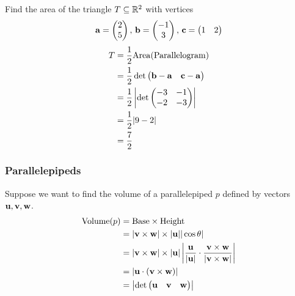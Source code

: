 \documentclass[10pt, a4paper]{article}
\begin{document}
\begin{example}
    Find the area of the triangle $T \subseteq \mathbb{R} ^ 2$ with vertices
    \[
    \mathbf{a} = \begin{pmatrix}
        2 \\ 5
    \end{pmatrix},\,\mathbf{b} = \begin{pmatrix}
        -1 \\ 3
    \end{pmatrix},\,\mathbf{c} = \begin{pmatrix}
        1 & 2
    \end{pmatrix}
    \]
    \begin{align*}
        T &= \frac{1}{2}\mathrm{Area}(\text{Parallelogram}) \\
        &= \frac{1}{2}\det\begin{pmatrix} \mathbf{b} - \mathbf{a} & \mathbf{c} - \mathbf{a}
        \end{pmatrix} \\
        &= \frac{1}{2}\left|\det\begin{pmatrix}
            -3 & -1 \\ -2 & -3
        \end{pmatrix}\right| \\
    &= \frac{1}{2}|9 - 2| \\
    &= \frac{7}{2}
    \end{align*}
\end{example}

\subsubsection{Parallelepipeds}
Suppose we want to find the volume of a parallelepiped $p$ defined by vectors $\mathbf{u, v, w}$.
\begin{align*}
    \mathrm{Volume}(p) &= \mathrm{Base} \times \mathrm{Height} \\
    &= |\mathbf{v \times w}| \times |\mathbf{u}||\cos\theta| \\
    &= |\mathbf{v \times w}| \times |\mathbf{u}|\left|\frac{\mathbf{u}}{|\mathbf{u}|} \cdot \frac{\mathbf{v} \times \mathbf{w}}{|\mathbf{v}\times \mathbf{w}|}\right| \\
    &= |\mathbf{u} \cdot (\mathbf{v} \times \mathbf{w})| \\
    &= \left|\det\begin{pmatrix}
        \mathbf{u} & \mathbf{v} & \mathbf{w}
    \end{pmatrix}\right|
\end{align*} 
\end{document}
